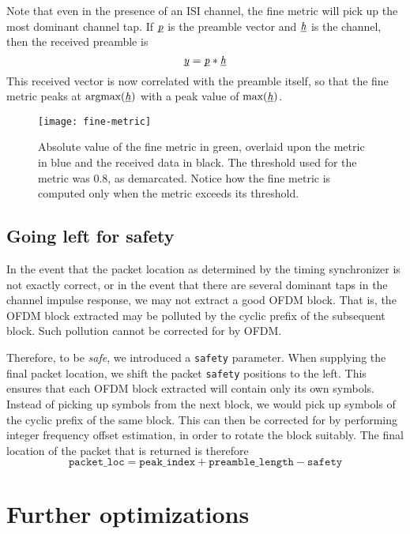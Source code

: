 Note that even in the presence of an ISI channel, the fine metric will pick up
the most dominant channel tap. If $\underbar{\emph{p}}$ is the preamble vector and $\underbar{\emph{h}}$
is the channel, then the received preamble is
$$\underbar{\emph{y}} = \underbar{\emph{p}} * \underbar{\emph{h}}$$
This received vector is now correlated with the preamble itself, so that the
fine metric peaks at $\text{argmax}(\underbar{\emph{h}})$ with a peak value of
$\text{max}(\underbar{\emph{h}})$.

\begin{figure}[h]
	\centering
	\texttt{[image: fine-metric]}
	\caption{Absolute value of the fine metric in green, overlaid upon the
	         metric in blue and the received data in black. The threshold used
	         for the metric was 0.8, as demarcated. Notice how the fine metric
	         is computed only when the metric exceeds its threshold.}
	\label{fig:fine-metric}
\end{figure}

\subsection{Going left for safety}
\label{subsec:safety}

In the event that the packet location as determined by the timing synchronizer
is not exactly correct, or in the event that there are several dominant taps
in the channel impulse response, we may not extract a good OFDM block. That is,
the OFDM block extracted may be polluted by the cyclic prefix of the subsequent
block. Such pollution cannot be corrected for by OFDM.

Therefore, to be \emph{safe}, we introduced a \verb+safety+ parameter. When
supplying the final packet location, we shift the packet \verb+safety+
positions to the left. This ensures that each OFDM block extracted will contain
only its own symbols. Instead of picking up symbols from the next block, we
would pick up symbols of the cyclic prefix of the same block. This can then be
corrected for by performing integer frequency offset estimation, in order to
rotate the block suitably. The final location of the packet that is returned is
therefore $$\texttt{packet\_loc} = \texttt{peak\_index} +
\texttt{preamble\_length} - \texttt{safety}$$


\section{Further optimizations}

